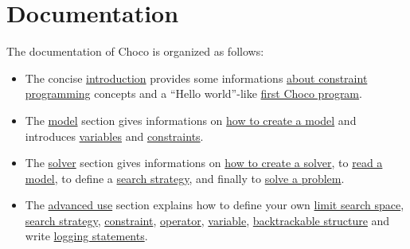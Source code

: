 \part{Documentation}\label{ch:doc}\hypertarget{ch:doc}{}

The documentation of Choco is organized as follows:
\begin{itemize}
\item 
The concise \hyperlink{doc:introduction}{introduction} provides some informations \hyperlink{introduction:aboutconstraintprogramming}{about constraint programming} concepts and a ``Hello world''-like \hyperlink{introduction:myfirstchocoprogram}{first Choco program}.
\item 
The \hyperlink{doc:model}{model} section gives informations on \hyperlink{doc:model}{how to create a model} and introduces \hyperlink{model:variables}{variables} and \hyperlink{model:constraints}{constraints}.
\item 
The \hyperlink{doc:solver}{solver} section gives informations on \hyperlink{doc:solver}{how to create a solver}, to \hyperlink{doc:solver}{read a model}, to define a \hyperlink{solver:searchstrategy}{search strategy}, and finally to \hyperlink{solver:solveaproblem}{solve a problem}.
\item 
The \hyperlink{doc:advanced}{advanced use} section explains how to define your own \hyperlink{advanced:defineyourownlimitsearchspace}{limit search space}, \hyperlink{advanced:defineyourownsearchstrategy}{search strategy}, \hyperlink{advanced:defineyourownconstraint}{constraint}, \hyperlink{advanced:defineyourownoperator}{operator}, \hyperlink{advanced:defineyourownvariable}{variable}, \hyperlink{advanced:backtrackablestructures}{backtrackable structure} and write \hyperlink{advanced:howtowriteloggingstatements}{logging statements}.
\end{itemize}



